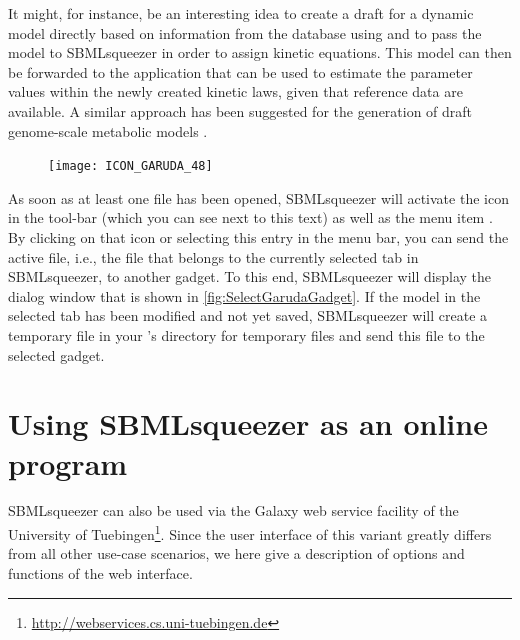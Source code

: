 It might, for instance, be an interesting idea to create a draft for a dynamic model directly based on information from the \KEGG database \citep{Kanehisa2000a} using \KEGGtranslator \citep{Wrzodek2011, Wrzodek2013} and to pass the model to SBMLsqueezer in order to assign kinetic equations. This model can then be forwarded to the application \SBMLsimulator \citep{Keller2013, Keller2014} that can be used to estimate the parameter values within the newly created kinetic laws, given that reference data are available.
A similar approach has been suggested for the generation of draft genome-scale metabolic models \citep{Buechel2013}.

\begin{figure}
\vspace{\wrapfigspace}
\texttt{[image: ICON\_GARUDA\_48]}
\end{figure}
As soon as at least one \SBML file has been opened, SBMLsqueezer will activate the \Garuda icon in the tool-bar (which you can see next to this text) as well as the menu item .
By clicking on that icon or selecting this entry in the menu bar, you can send the active file, i.e., the file that belongs to the currently selected tab in SBMLsqueezer, to another gadget.
To this end, SBMLsqueezer will display the dialog window that is shown in \vref{fig:SelectGarudaGadget}.
If the model in the selected tab has been modified and not yet saved, SBMLsqueezer will create a temporary file in your \OS's directory for temporary files and send this file to the selected gadget.

\section{Using SBMLsqueezer as an online program}
\label{sec:SBMLsqueezer_online_version}

SBMLsqueezer can also be used via the Galaxy web service facility \citep{Goecks2010} of the University of Tuebingen\footnote{\url{http://webservices.cs.uni-tuebingen.de}\label{fn:Webservices}}.
Since the user interface of this variant greatly differs from all other use-case scenarios, we here give a description of options and functions of the web interface.

